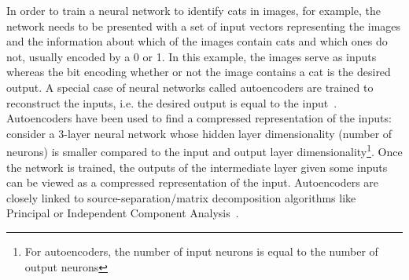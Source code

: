  In order to train a neural network to identify cats in images, for example, the network needs to be presented with a set of input vectors representing the images and the information about which of the images contain cats and which ones do not, usually encoded by a 0 or 1. In this example, the images serve as inputs whereas the bit encoding whether or not the image contains a cat is the desired output. A special case of neural networks called autoencoders are trained to reconstruct the inputs, i.e. the desired output is equal to the input~\cite{hinton1994autoencoders}. Autoencoders have been used to find a compressed representation of the inputs: consider a 3-layer neural network whose hidden layer dimensionality (number of neurons) is smaller compared to the input and output layer dimensionality\footnote{For autoencoders, the number of input neurons is equal to the number of output neurons}. Once the network is trained, the outputs of the intermediate layer given some inputs can be viewed as a compressed representation of the input. Autoencoders are closely linked to source-separation/matrix decomposition algorithms like Principal or Independent Component Analysis~\cite{hyvarinen2000independent,jolliffe2011principal}.

